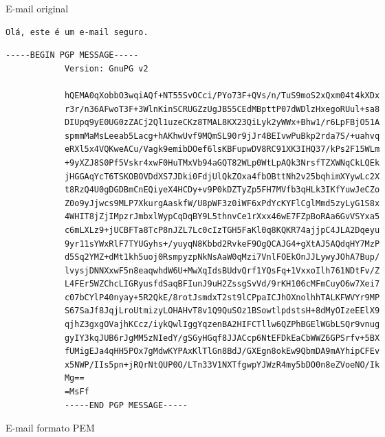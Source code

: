 \documentclass[
    article,            %
    11pt,               %
    oneside,            %
    a4paper,            %
    english,            %
    brazil,             %
    sumario=tradicional,
    ]{abntex2}
\begin{document}
\begin{figure}[H]
    \centering
    \caption{E-mail original}
    \label{fig3}
    \begin{Verbatim}[frame=single, commandchars=\\\{\}, fontsize=\footnotesize]
                            Olá, este é um e-mail seguro.
    \end{Verbatim}

    \caption{E-mail formato PEM}
    \label{fig4}
    \begin{Verbatim}[frame=single, commandchars=\\\{\}, fontsize=\footnotesize]
            -----BEGIN PGP MESSAGE-----
            Version: GnuPG v2

            hQEMA0qXobbO3wqiAQf+NT55SvOCci/PYo73F+QVs/n/TuS9moS2xQxm04t4kXDx
            r3r/n36AFwoT3F+3WlnKinSCRUGZzUgJB55CEdMBpttP07dWDlzHxegoRUul+sa8
            DIUpq9yE0UG0zZACj2Ql1uzeCKz8TMAL8KX23QiLyk2yWWx+Bhw1/r6LpFBjO51A
            spmmMaMsLeeab5Lacg+hAKhwUvf9MQmSL90r9jJr4BEIvwPuBkp2rda7S/+uahvq
            eRXl5x4VQKweACu/Vagk9emibDOef6lsKBFupwDV8RC91XK3IHQ37/kPs2F15WLm
            +9yXZJ8S0Pf5Vskr4xwF0HuTMxVb94aGQT82WLp0WtLpAQk3NrsfTZXWNqCkLQEk
            jHGGAqYcT6TSKOBOVDdXS7JDki0FdjUlQkZOxa4fbOBttNh2v25bqhimXYywLc2X
            t8RzQ4U0gDGDBmCnEQiyeX4HCDy+v9P0kDZTyZp5FH7MVfb3qHLk3IKfYuwJeCZo
            Z0o9yJjwcs9MLP7XkurgAaskfW/U8pWF3z0iWF6xPdYcKYFlCglMmd5zyLyG1S8x
            4WHIT8jZjIMpzrJmbxlWypCqDqBY9L5thnvCe1rXxx46wE7FZpBoRAa6GvVSYxa5
            c6mLXLz9+jUCBFTa8TcP8nJZL7Lc0cIzTGH5FaKl0q8KQKR74ajjpC4JLA2Dqeyu
            9yr11sYWxRlF7TYUGyhs+/yuyqN8Kbbd2RvkeF9OgQCAJG4+gXtAJ5AQdqHY7MzP
            d5Sq2YMZ+dMt1kh5uoj0RsmpyzpNkNsAaW0qMzi7VnlFOEkOnJJLywyJOhA7Bup/
            lvysjDNNXxwF5n8eaqwhdW6U+MwXqIdsBUdvQrf1YQsFq+1VxxoIlh761NDtFv/Z
            L4FEr5WZChcLIGRyusfdSaqBFIunJ9uH2ZssgSvVd/9rKH106cMFmCuyO6w7Xei7
            c07bCYlP40nyay+5R2QkE/8rotJsmdxT2st9lCPpaICJhOXnolhhTALKFWVYr9MP
            S67SaJf8JqjLroUtmizyLOHAHvT8v1Q9QuSOz1BSowtlpdstsH+8dMyOIzeEElX9
            qjhZ3gxgOVajhKCcz/iykQwlIggYqzenBA2HIFCTllw6QZPhBGElWGbLSQr9vnug
            gyIY3kqJUB6rJgMM5zNIedY/gSGyHGqf8JJACcp6NtEFDkEaCbWWZ6GPSrfv+5BX
            fUMigEJa4qHH5POx7gMdwKYPAxKlTlGn8BdJ/GXEgn8okEw9QbmDA9mAYhipCFEv
            x5NWP/IIs5pn+jRQrNtQUP0O/LTn33V1NXTfgwpYJWzR4my5bDO0n8eZVoeNO/Ik
            Mg==
            =MsFf
            -----END PGP MESSAGE-----
    \end{Verbatim}
\end{figure}
\end{document}
